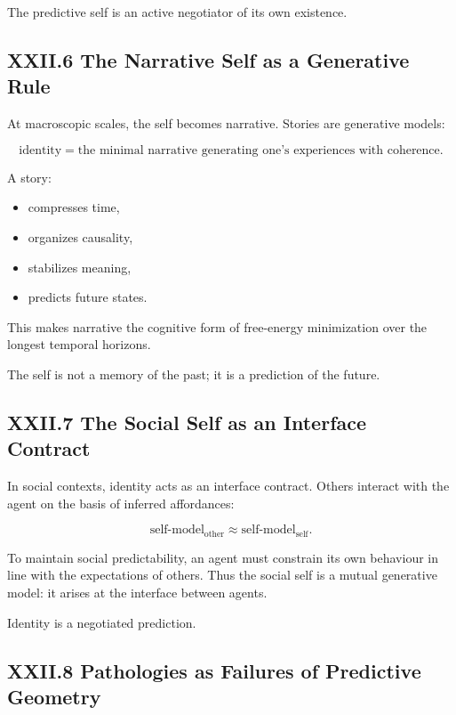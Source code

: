 \documentclass[12pt,letterpaper]{article}
\begin{document}
The predictive self is an active negotiator of its own existence.

\subsection{XXII.6 The Narrative Self as a Generative Rule}

At macroscopic scales, the self becomes narrative.  
Stories are generative models:

\[
\text{identity} = \text{the minimal narrative generating one's experiences with coherence}.
\]

A story:

\begin{itemize}
    \item compresses time,
    \item organizes causality,
    \item stabilizes meaning,
    \item predicts future states.
\end{itemize}

This makes narrative the cognitive form of free-energy minimization over the longest temporal horizons.

The self is not a memory of the past; it is a prediction of the future.

\subsection{XXII.7 The Social Self as an Interface Contract}

In social contexts, identity acts as an interface contract.  
Others interact with the agent on the basis of inferred affordances:

\[
\text{self-model}_{\text{other}} \approx \text{self-model}_{\text{self}}.
\]

To maintain social predictability, an agent must constrain its own behaviour in line with the expectations of others. Thus the social self is a mutual generative model: it arises at the interface between agents.

Identity is a negotiated prediction.

\subsection{XXII.8 Pathologies as Failures of Predictive Geometry}
\end{document}
